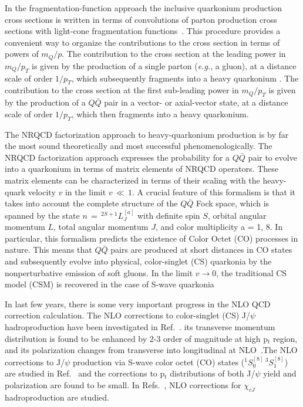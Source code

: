 \documentclass[aps,prc,preprint,superscriptaddress,showpacs,showkeys,amsmath]{revtex4-1}
\begin{document}
In the fragmentation-function approach the inclusive
quarkonium production cross sections is written  
in terms of convolutions of parton production cross sections 
with light-cone fragmentation functions~\cite{Nayak:2005rw,Nayak:2005rt}.
This procedure provides a convenient way to organize the contributions
to the cross section in terms of powers of $m_Q/p$.
The contribution to the cross section at the
leading power in $m_Q/p_T$ is given by the production of a single parton
({\it e.g.}, a gluon), at a distance scale of order $1/p_T$, which
subsequently fragments into a heavy quarkonium
\cite{Braaten:1996pv}.  The contribution to the cross section at the
first sub-leading power in $m_Q/p_T$ is given by the production of a
$Q\bar Q$ pair in a vector- or axial-vector state, at a distance scale of
order $1/p_T$, which then fragments into a heavy quarkonium.

The NRQCD factorization approach \cite{Bodwin:1994jh} to
heavy-quarkonium production is by far the most sound theoretically
and most successful phenomenologically. 
The NRQCD factorization approach 
expresses the probability for a $Q\bar Q$ pair to evolve into a quarkonium 
in terms of matrix elements of NRQCD operators. These matrix elements can be 
characterized in terms of their scaling with the heavy-quark velocity $v$ in the limit $v\,\ll\,1$.
A crucial feature of this formalism is that it takes into account the complete structure of the 
$Q\bar Q$ Fock space, which is spanned by the state $n\,=\,^{2S+1}L_{J}^{[a]}$ with definite spin $S$, 
orbital angular momentum $L$, total angular momentum $J$, and color multiplicity a = 1, 8. In particular, 
this formalism predicts the existence of Color Octet (CO) processes in nature. This means that 
$Q\bar Q$ pairs are produced at short distances in CO states and subsequently evolve into 
physical, color-singlet (CS) quarkonia by the nonperturbative emission of soft gluons. 
In the limit $v\rightarrow0$, the traditional CS model (CSM) is recovered in the 
case of S-wave quarkonia

In last few years, there is some very important progress in the NLO QCD correction 
calculation. The NLO corrections to color-singlet (CS) J/$\psi$ hadroproduction 
have been investigated in Ref.~\cite{Campbell:2007ws,Gong:2008sn}. its transverse momentum distribution is 
found to be enhanced by 2-3 order of magnitude at high p$_t$ region, and its 
polarization changes from transverse into longitudinal at NLO~\cite{Gong:2008sn}.The
NLO corrections to J/$\psi$ production via S-wave color octet (CO) states 
($^1S_{0}^{[8]}\,^3S_{1}^{[8]}$) are studied in Ref.~\cite{Gong:2008ft} and the corrections 
to p$_{t}$ distributions of both J/$\psi$ yield and polarization are found to be small. 
In Refs.~\cite{Ma:2010vd}, NLO corrections for $\chi_{cJ}$ hadroproduction are studied.
\end{document}
